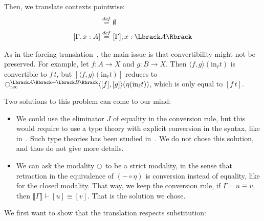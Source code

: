 Then, we translate contexts pointwise:
\begin{align*}
  [\emptyset] &\defeq \emptyset \\
  [\Gamma,x:A] &\defeq [\Gamma],x:\Lbrack A\Rbrack
\end{align*}

As in the forcing translation~\cite{jaber2012extending}, the main
issue is that convertibility might not be preserved. For
example, let $f:A \to X$ and $g:B\to X$. Then $\langle f,g\rangle
(\mathrm{in}_\ell t)$ is convertible to $f\,t$, but $[\langle f,g\rangle
(\mathrm{in}_\ell t)]$ reduces to $\modal_{\mathrm{rec}}^{\Lbrack A\Rbrack +
                                      \Lbrack
                                      B\Rbrack}\langle[f],[g]\rangle(\eta(\mathrm{in}_\ell
                                    t))$, which is only equal to $[f\,t]$.


Two solutions to this problem can come to our mind:
\begin{itemize}
\item We could use the eliminator $J$ of equality in the conversion
  rule, but this would require to use a type theory with explicit
  conversion in the syntax, like in~\cite{jaber2012extending}. Such
  type theories has been studied
  in~\cite{geuvers2004,van2013explicit}. We do not chose this
  solution, and thus do not give more details.
\item We can ask the modality $\ocircle$ to be a strict modality, in the
  sense that retraction in the equivalence of $(-\circ\eta)$ is conversion
  instead of equality, like for the closed modality. 
  That way, we keep the conversion rule, \ie{} if $\Gamma \vdash
  u \equiv v$, then $\Lbrack \Gamma \Rbrack \vdash [u] \equiv [v]$.
  That is the solution we chose.
\end{itemize}


We first want to show that the translation respects substitution:

